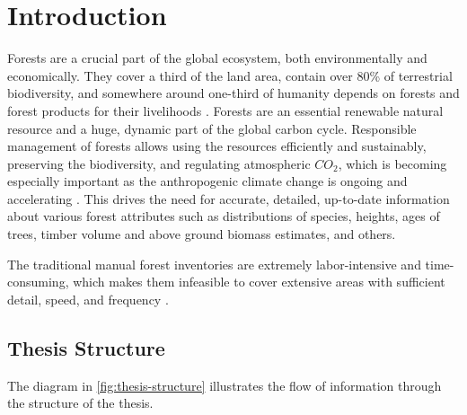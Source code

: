 \chapter{Introduction}

Forests are a crucial part of the global ecosystem, both environmentally and economically.
They cover a third of the land area, contain over 80\% of terrestrial biodiversity, and somewhere around one-third of humanity depends on forests and forest products for their livelihoods \cite{aertsForestRestorationBiodiversity2011,StateWorldsForests2020}.
Forests are an essential renewable natural resource and a huge, dynamic part of the global carbon cycle.
Responsible management of forests allows using the resources efficiently and sustainably, preserving the biodiversity, and regulating atmospheric $CO_2$, which is becoming especially important as the anthropogenic climate change is ongoing and accelerating \cite{faheyForestCarbonStorage2010,forsterIndicatorsGlobalClimate2024}.
This drives the need for accurate, detailed, up-to-date information about various forest attributes such as distributions of species, heights, ages of trees, timber volume and above ground biomass estimates, and others.

The traditional manual forest inventories are extremely labor-intensive and time-consuming, which makes them infeasible to cover extensive areas with sufficient detail, speed, and frequency \cite{burleyEncyclopediaForestSciences2004}.



\section{Thesis Structure}
The diagram in \autoref{fig:thesis-structure} illustrates the flow of information through the structure of the thesis.

